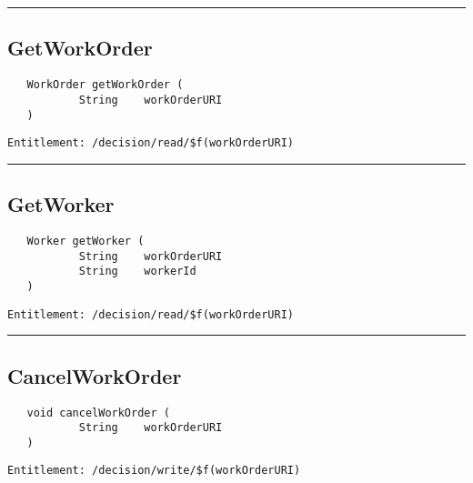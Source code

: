\rule{12cm}{2pt}
\subsection{GetWorkOrder}
\label{Api:GetWorkOrder}
\begin{verbatim}
   WorkOrder getWorkOrder (
           String    workOrderURI
   )
\end{verbatim}
\begin{Verbatim}[fontsize=\small, formatcom=\color{Maroon}]
  Entitlement: /decision/read/$f(workOrderURI)
\end{Verbatim}



\rule{12cm}{2pt}
\subsection{GetWorker}
\label{Api:GetWorker}
\begin{verbatim}
   Worker getWorker (
           String    workOrderURI
           String    workerId
   )
\end{verbatim}
\begin{Verbatim}[fontsize=\small, formatcom=\color{Maroon}]
  Entitlement: /decision/read/$f(workOrderURI)
\end{Verbatim}



\rule{12cm}{2pt}
\subsection{CancelWorkOrder}
\label{Api:CancelWorkOrder}
\begin{verbatim}
   void cancelWorkOrder (
           String    workOrderURI
   )
\end{verbatim}
\begin{Verbatim}[fontsize=\small, formatcom=\color{Maroon}]
  Entitlement: /decision/write/$f(workOrderURI)
\end{Verbatim}



